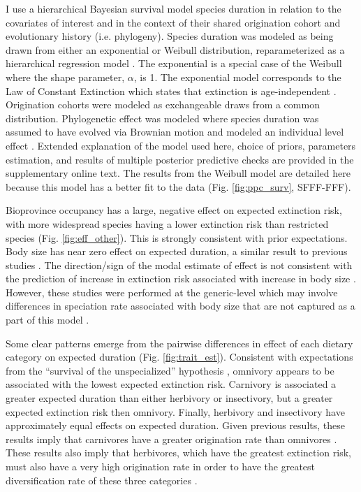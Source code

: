 \documentclass[12pt]{article}
\begin{document}
I use a hierarchical Bayesian survival model species duration in relation to the covariates of interest and in the context of their shared origination cohort and evolutionary history (i.e. phylogeny). Species duration was modeled as being drawn from either an exponential or Weibull distribution, reparameterized as a hierarchical regression model \cite{Gelman2013d}. The exponential is a special case of the Weibull where the shape parameter, $\alpha$, is 1. The exponential model corresponds to the Law of Constant Extinction which states that extinction is age-independent \cite{VanValen1973}. Origination cohorts were modeled as exchangeable draws from a common distribution. Phylogenetic effect was modeled where species duration was assumed to have evolved via Brownian motion and modeled an individual level effect \cite{Housworth2004}. Extended explanation of the model used here, choice of priors, parameters estimation, and results of multiple posterior predictive checks are provided in the supplementary online text. The results from the Weibull model are detailed here because this model has a better fit to the data (Fig. \ref{fig:ppc_surv}, SFFF-FFF).

Bioprovince occupancy has a large, negative effect on expected extinction risk, with more widespread species having a lower extinction risk than restricted species (Fig. \ref{fig:eff_other}). This is strongly consistent with prior expectations. Body size has near zero effect on expected duration, a similar result to previous studies \cite{Tomiya2013}. The direction/sign of the modal estimate of effect is not consistent with the prediction of increase in extinction risk associated with increase in body size \cite{Liow2008}. However, these studies were performed at the generic-level which may involve differences in speciation rate associated with body size that are not captured as a part of this model \cite{Tomiya2013,Liow2008}.

Some clear patterns emerge from the pairwise differences in effect of each dietary category on expected duration (Fig. \ref{fig:trait_est}). Consistent with expectations from the ``survival of the unspecialized'' hypothesis \cite{Liow2004a,Simpson1944}, omnivory appears to be associated with the lowest expected extinction risk. Carnivory is associated a greater expected duration than either herbivory or insectivory, but a greater expected extinction risk then omnivory. Finally, herbivory and insectivory have approximately equal effects on expected duration. Given previous results, these results imply that carnivores have a greater origination rate than omnivores \cite{Price2012}. These results also imply that herbivores, which have the greatest extinction risk, must also have a very high origination rate in order to have the greatest diversification rate of these three categories \cite{Price2012}. 
\end{document}
